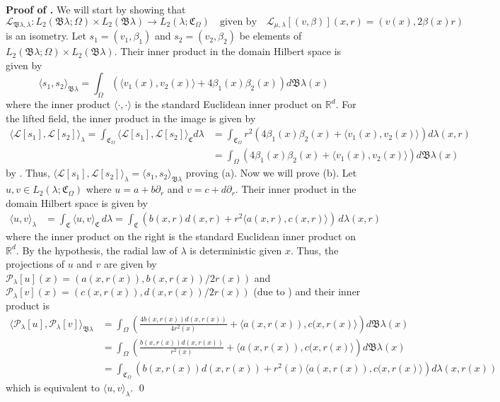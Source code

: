 \documentclass[11pt]{article}
\begin{document}
\noindent \textbf{Proof of .} We will start by showing that 
\[\mathcal{L}_{\mathfrak{B}\lambda, \lambda}: L_2(\mathfrak{B}\lambda; \Omega) \times L_2(\mathfrak{B}\lambda) \rightarrow L_2(\lambda; \mathfrak{C}_\Omega) \quad \text{given by} \quad \mathcal{L}_{\mu, \lambda}[(v, \beta)](x,r) = (v(x), 2\beta(x)r)\]
is an isometry. Let $s_1 = (v_1, \beta_1)$ and $s_2 = (v_2, \beta_2)$ be elements of $L_2(\mathfrak{B}\lambda; \Omega) \times L_2(\mathfrak{B}\lambda)$. Their inner product in the domain Hilbert space is given by 
\[\langle s_1, s_2\rangle_{\mathfrak{B}\lambda} = \int_{\Omega}\left( \langle v_1(x), v_2(x)\rangle + 4\beta_1(x)\beta_2(x)\right)d\mathfrak{B}\lambda(x) \]
where the inner product $\langle\cdot, \cdot\rangle$ is the standard Euclidean inner product on $\mathbb{R}^d$. For the lifted field, the inner product in the image is given by
\begin{align*}\langle \mathcal{L}[s_1], \mathcal{L}[s_2]\rangle_{\lambda} = \int_{\mathfrak{C}_\Omega} \langle \mathcal{L}[s_1], \mathcal{L}[s_2]\rangle_{\mathfrak{C}} d\lambda &= \int_{\mathfrak{C}_\Omega}r^2\left(4\beta_1(x)\beta_2(x) + \langle v_1(x), v_2(x) \rangle\right)d\lambda(x,r) \\
&= \int_\Omega \left(4\beta_1(x)\beta_2(x) + \langle v_1(x), v_2(x) \rangle\right)d\mathfrak{B}\lambda(x)
\end{align*}
by . Thus, $\langle \mathcal{L}[s_1], \mathcal{L}[s_2]\rangle_{\lambda} = \langle s_1, s_2\rangle_{\mathfrak{B}\lambda}$ proving (a). Now we will prove (b). Let $u, v \in L_2(\lambda; \mathfrak{C}_\Omega)$ where $u = a + b\partial_r$ and $v = c + d\partial_r$. Their inner product in the domain Hilbert space is given by
\begin{align*}
    \langle u, v\rangle_{\lambda} &= \int_{\mathfrak{C}} \langle u, v \rangle_{\mathfrak{C}}\,d\lambda = \int_{\mathfrak{C}} \left(b(x,r)d(x,r) + r^2\langle a(x,r), c(x,r)\rangle \right)\,d\lambda(x,r)
\end{align*}
where the inner product on the right is the standard Euclidean inner product on $\mathbb{R}^d$. By the hypothesis, the radial law of $\lambda$ is deterministic given $x$. Thus, the projections of $u$ and $v$ are given by $\mathcal{P}_{\lambda}[u](x) = (a(x,r(x)), b(x,r(x))/2r(x))$ and $\mathcal{P}_{\lambda}[v](x) = (c(x,r(x)), d(x,r(x))/2r(x))$ (due to ) and their inner product is
\begin{align*}
    \langle \mathcal{P}_{\lambda}[u], \mathcal{P}_{\lambda}[v]\rangle_{\mathfrak{B}\lambda} &= \int_{\Omega} \left(\frac{4b(x, r(x))d(x, r(x))}{4r^2(x)} +  \langle a(x, r(x)), c(x,r(x)\rangle\right)d\mathfrak{B\lambda}(x) \\
    &= \int_{\Omega}\left(\frac{b(x, r(x))d(x, r(x))}{r^2(x)} +  \langle a(x, r(x)), c(x,r(x)\rangle\right)d\mathfrak{B\lambda}(x) \\
    &= \int_{\mathfrak{C}_\Omega}\left(b(x, r(x))d(x, r(x)) +  r^2(x)\langle a(x, r(x)), c(x,r(x)\rangle\right)d\lambda(x, r(x))
\end{align*}
which is equivalent to $\langle u, v \rangle_\lambda$. \qed{}
\\
\end{document}
